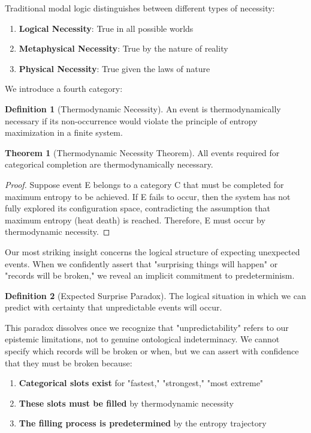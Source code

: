 \documentclass[12pt,a4paper]{article}
\theoremstyle{definition}
\newtheorem{definition}{Definition}[section]
\newtheorem{theorem}{Theorem}[section]
\begin{document}
{Traditional modal logic distinguishes between different types of necessity:
\begin{enumerate}
\item \textbf{Logical Necessity}: True in all possible worlds
\item \textbf{Metaphysical Necessity}: True by the nature of reality
\item \textbf{Physical Necessity}: True given the laws of nature
\end{enumerate}

We introduce a fourth category:

\begin{definition}[Thermodynamic Necessity]
An event is thermodynamically necessary if its non-occurrence would violate the principle of entropy maximization in a finite system.
\end{definition}

\begin{theorem}[Thermodynamic Necessity Theorem]
All events required for categorical completion are thermodynamically necessary.
\end{theorem}

\begin{proof}
Suppose event E belongs to a category C that must be completed for maximum entropy to be achieved. If E fails to occur, then the system has not fully explored its configuration space, contradicting the assumption that maximum entropy (heat death) is reached. Therefore, E must occur by thermodynamic necessity.
\end{proof}

Our most striking insight concerns the logical structure of expecting unexpected events. When we confidently assert that "surprising things will happen" or "records will be broken," we reveal an implicit commitment to predeterminism.

\begin{definition}[Expected Surprise Paradox]
The logical situation in which we can predict with certainty that unpredictable events will occur.
\end{definition}

This paradox dissolves once we recognize that "unpredictability" refers to our epistemic limitations, not to genuine ontological indeterminacy. We cannot specify which records will be broken or when, but we can assert with confidence that they must be broken because:

\begin{enumerate}
\item \textbf{Categorical slots exist} for "fastest," "strongest," "most extreme"
\item \textbf{These slots must be filled} by thermodynamic necessity
\item \textbf{The filling process is predetermined} by the entropy trajectory
\end{enumerate}

}
\end{document}
